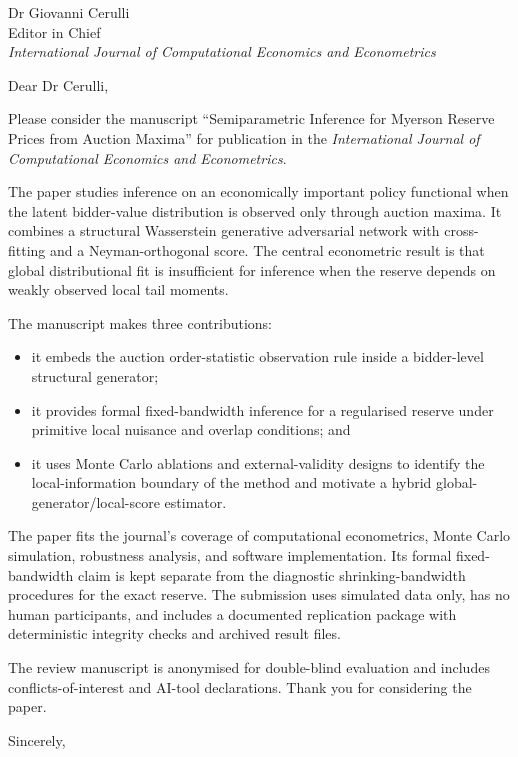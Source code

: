 \documentclass[11pt]{letter}
\date{July 19, 2026}
\begin{document}
\begin{letter}{Dr Giovanni Cerulli\\
Editor in Chief\\
\textit{International Journal of Computational Economics and Econometrics}}

\opening{Dear Dr Cerulli,}

Please consider the manuscript ``Semiparametric Inference for Myerson Reserve
Prices from Auction Maxima'' for publication in the \textit{International
Journal of Computational Economics and Econometrics}.

The paper studies inference on an economically important policy functional when
the latent bidder-value distribution is observed only through auction maxima.
It combines a structural Wasserstein generative adversarial network with
cross-fitting and a Neyman-orthogonal score. The central econometric result is
that global distributional fit is insufficient for inference when the reserve
depends on weakly observed local tail moments.

The manuscript makes three contributions:
\begin{itemize}
  \item it embeds the auction order-statistic observation rule inside a
  bidder-level structural generator;
  \item it provides formal fixed-bandwidth inference for a regularised reserve
  under primitive local nuisance and overlap conditions; and
  \item it uses Monte Carlo ablations and external-validity designs to identify
  the local-information boundary of the method and motivate a hybrid
  global-generator/local-score estimator.
\end{itemize}

The paper fits the journal's coverage of computational econometrics, Monte
Carlo simulation, robustness analysis, and software implementation. Its formal
fixed-bandwidth claim is kept separate from the diagnostic shrinking-bandwidth
procedures for the exact reserve. The submission uses simulated data only, has
no human participants, and includes a documented replication package with
deterministic integrity checks and archived result files.

The review manuscript is anonymised for double-blind evaluation and includes
conflicts-of-interest and AI-tool declarations. Thank you for considering the
paper.

\closing{Sincerely,}

\end{letter}
\end{document}
